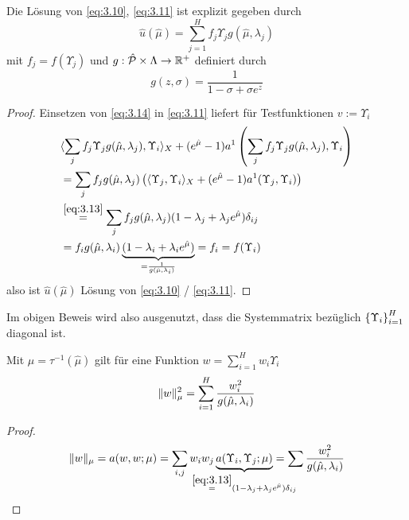 \begin{lemma}[Lösungsdarstellung]
\label{3.38}
	Die Lösung von \eqref{eq:3.10}, \eqref{eq:3.11} ist explizit gegeben durch
	\begin{equation}
		\hat u(\hat\mu) = \sum_{j=1}^H f_j \Upsilon_j g(\hat\mu,\lambda_j) \label{eq:3.14}
	\end{equation}
	mit $f_j = f(\Upsilon_j)$ und $g: \hat{\mathcal{P}} \times \Lambda \to \mathbb{R}^+$ definiert durch
	\begin{equation}
		g(z,\sigma) = \frac{1}{1-\sigma+\sigma e^z} \label{eq:3.15}
	\end{equation}

	\begin{proof}
		Einsetzen von \eqref{eq:3.14} in \eqref{eq:3.11} liefert für Testfunktionen $v := \Upsilon_i$
		\begin{align*}
			&\langle \sum_j f_j \Upsilon_j g(\hat\mu,\lambda_j), \Upsilon_i \rangle_X + (e^{\hat\mu}-1) a^1\left( \sum_j f_j \Upsilon_j g(\hat\mu,\lambda_j), \Upsilon_i \right)\\
			&= \sum_j f_j g(\hat\mu,\lambda_j) \left( \langle \Upsilon_j, \Upsilon_i \rangle_X + (e^{\hat\mu}-1) a^1(\Upsilon_j,\Upsilon_i) \right)\\
			&\stackrel{\eqref{eq:3.13}}{=} \sum_j f_j g(\hat\mu,\lambda_j)(1-\lambda_j+\lambda_j e^{\hat\mu}) \delta_{ij}\\
			&= f_i g(\hat\mu,\lambda_i)\underbrace{(1-\lambda_i+\lambda_i e^{\hat\mu})}_{=\frac{1}{g(\hat\mu,\lambda_i)}} = f_i = f(\Upsilon_i) 
		\end{align*}
		also ist $\hat u(\hat\mu)$ Lösung von \eqref{eq:3.10} / \eqref{eq:3.11}.
	\end{proof}
\end{lemma}

\begin{bem}
	Im obigen Beweis wird also ausgenutzt, dass die Systemmatrix bezüglich $\left\{\Upsilon_i\right\}_{i=1}^H$ diagonal ist.
\end{bem}

\begin{lemma}
\label{3.39}
	Mit $\mu = \tau^{-1}(\hat\mu)$ gilt für eine Funktion $w = \sum_{i=1}^H w_i \Upsilon_i$
	\[
		\|w\|_\mu^2 = \sum_{i=1}^H \frac{w_i^2}{g(\hat\mu,\lambda_i)}
	\]

	\begin{proof}
		\[
			\norm{w}_{\mu} = a(w,w;\mu) = \sum_{i,j} w_i w_j \underbrace{a(\Upsilon_i,\Upsilon_j;\mu)}_{\mathclap{\stackrel{\eqref{eq:3.13}}{=} (1-\lambda_j+\lambda_j e^{\hat\mu}) \delta_{ij}}} = \sum \frac{w_i^2}{g(\hat\mu,\lambda_i)}
		\]
	\end{proof}
\end{lemma}

